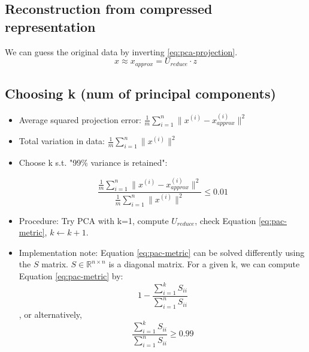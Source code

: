 \subsection{Reconstruction from compressed representation}
    We can guess the original data by inverting \ref{eq:pca-projection}.
    \[
        x \approx x_{approx} = U_{reduce} \cdot z
    \] 

\subsection{Choosing k (num of principal components)}

    \begin{itemize}
        \item Average squared projection error: $\frac{1}{m} \sum_{i=1}^{n} \| x^{(i)} - x_{approx}^{(i)} \| ^2$
        \item Total variation in data: $\frac{1}{m} \sum_{i=1}^{n} \| x^{(i)} \|^2$
        \item Choose k s.t. "99\% variance is retained":
            
            \begin{equation}
                \frac{ \frac{1}{m} \sum_{i=1}^{n} \| x^{(i)} - x_{approx}^{(i)} \| ^2}{\frac{1}{m} \sum_{i=1}^{n} \| x^{(i)} \|^2} \leq  0.01
                \label{eq:pac-metric}
            \end{equation} 
            
        \item Procedure: Try PCA with k=1, compute $U_{reduce}$, check Equation \ref{eq:pac-metric}, $k\gets k+1$.
        \item Implementation note: Equation \ref{eq:pac-metric} can be solved differently using the $S$ matrix. $S \in \mathbb{R} ^{n \times n}$ is a diagonal matrix. For a given k, we can compute Equation \ref{eq:pac-metric} by: 
            \[
                1 - \frac{\sum_{i=1}^{k} S_{ii}}{\sum_{i=1}^{n} S_{ii}}
            \], or alternatively,  
            \[
                \frac{\sum_{i=1}^{k} S_{ii}}{\sum_{i=1}^{n} S_{ii}} \geq 0.99
            \] 

    \end{itemize}
